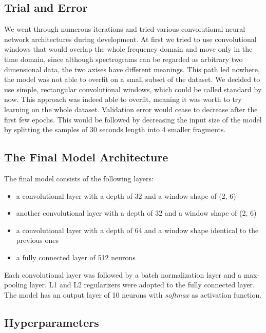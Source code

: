 \documentclass{article}
\begin{document}
    \subsection{Trial and Error}

    We went through numerous iterations and tried various convolutional neural
    network architectures during development. At first we tried to use convolutional
    windows that would overlap the whole frequency domain and move only in the time domain,
    since although spectrograms can be regarded as arbitrary two dimensional data, the two
    axises have different meanings. This path led nowhere, the model was not able to
    overfit on a small subset of the dataset. We decided to use simple, rectangular convolutional
    windows, which could be called standard by now. This approach was indeed able to overfit, meaning
    it was worth to try learning on the whole dataset. Validation error would cease to decrease
    after the first few epochs. This would be followed by decreasing the input size of the model
    by splitting the samples of 30 seconds length into 4 smaller fragments.

    \subsection{The Final Model Architecture}

    The final model consists of the following layers:

    \begin{itemize}
        \item a convolutional layer with a depth of 32 and a window shape of (2, 6)
        \item another convolutional layer with a depth of 32 and a window shape of (2, 6)
        \item a convolutional layer with a depth of 64 and a window shape identical to the previous ones
        \item a fully connected layer of 512 neurons
    \end{itemize}

    Each convolutional layer was followed by a batch normalization
    layer and a max-pooling layer. L1 and L2 regularizers were adopted to the fully connected layer.
    The model has an output layer of 10 neurons with \emph{softmax} as activation function.

    \subsection{Hyperparameters}
\end{document}
